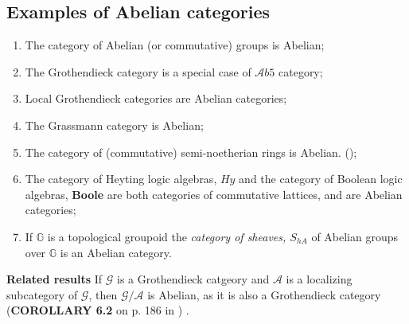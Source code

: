 \documentclass[12pt]{article}
\theoremstyle{plain}
\theoremstyle{definition}
\numberwithin{equation}{section}
\newcommand{\A}{\mathcal A}
\newcommand{\G}{\mathcal G}
\newcommand{\grp}{{\mathbb G}}
\begin{document}
\subsection{Examples of {\em} Abelian categories} 
\begin{enumerate} 
\item The category of Abelian (or commutative) groups is Abelian;
\item The Grothendieck category is a special case of $\mathcal{\A}b5$ category; 
\item Local Grothendieck categories are Abelian categories;
\item The Grassmann category is Abelian;
\item The category of (commutative) semi-noetherian rings is Abelian. (\cite{NP73});
\item The category of Heyting logic algebras, $Hy$ and the category of Boolean logic algebras, \textbf{Boole} are both categories of commutative lattices, and are Abelian categories;
\item If $\grp$ is a topological groupoid the {\em category of sheaves, $S_{hA}$} of Abelian groups over $\grp$ is an Abelian category.
\end{enumerate}

\textbf{Related results} 
If $\mathcal{\G}$ is a Grothendieck catgeory and $\mathcal{\A}$ is a localizing subcategory of $\mathcal{\G}$, then $\mathcal{\G} \slash \mathcal{\A}$ is
Abelian, as it is also a Grothendieck category (\textbf{COROLLARY 6.2} on p. 186 in \cite{NP73}) .
\end{document}
